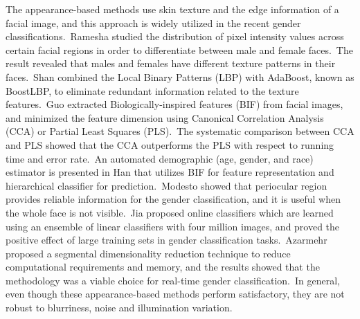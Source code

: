 \documentclass[10pt,twocolumn,letterpaper]{article}
\begin{document}
The appearance-based methods use skin texture and the edge information of a facial image, and this approach is widely utilized in the recent gender classifications.~Ramesha \etal \cite{Ramesha2012} studied the distribution of pixel intensity values across certain facial regions in order to differentiate between male and female faces.~The result revealed that males and females have different texture patterns in their faces.~Shan \cite{Shan2012} combined the Local Binary Patterns (LBP) with AdaBoost, known as BoostLBP, to eliminate redundant information related to the texture features.~Guo \etal \cite{Guo2013, Guo2014} extracted Biologically-inspired features (BIF) from facial images, and minimized the feature dimension using Canonical Correlation Analysis (CCA) or Partial Least Squares (PLS).~The systematic comparison between CCA and PLS showed that the CCA outperforms the PLS with respect to running time and error rate.~An automated demographic (age, gender, and race) estimator is presented in Han \etal \cite{Han2015} that utilizes BIF for feature representation and hierarchical classifier for prediction.~Modesto \etal \cite{Modesto2016} showed that periocular region provides reliable information for the gender classification, and it is useful when the whole face is not visible.~Jia \etal \cite{Jia2015} proposed online classifiers which are learned using an ensemble of linear classifiers with four million images, and proved the positive effect of large training sets in gender classification tasks.~Azarmehr \etal \cite{Azarmehr2015} proposed a segmental dimensionality reduction technique to reduce computational requirements and memory, and the results showed that the methodology was a viable choice for real-time gender classification.~In general, even though these appearance-based methods perform satisfactory, they are not robust to blurriness, noise and illumination variation.
\end{document}
